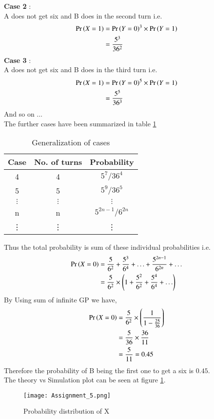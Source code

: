 \documentclass[journal,12pt,twocolumn]{IEEEtran}
\begin{document}
\textbf{Case 2} : \\
A does not get six and B does in the second turn i.e. 
\begin{align}
    \Pr\left(X=1\right) &= {\Pr\left(Y=0\right)}^3  \times \Pr\left(Y=1\right) \\
              &= \frac{5^3}{36^2}
\end{align}
\textbf{Case 3} : \\
A does not get six and B does in the third turn i.e. 
\begin{align}
    \Pr\left(X=1\right) &= {\Pr\left(Y=0\right)}^5  \times \Pr\left(Y=1\right) \\
              &= \frac{5^5}{36^3}
\end{align}
And so on $\hdots$ \\
The further cases have been summarized in table \ref{tab:Cases} \\
\begin{table}[hbt]
\centering
\begin{tabular}{|c|c|c|}
\hline
\textbf{Case}          & \textbf{No. of turns} & \textbf{Probability}  \\ \hline
4                      & 4                     & $5^7/36^4$             \\ \hline
5                      & 5                     & $ 5^9 / 36 ^5 $        \\ \hline
$\vdots$               & $\vdots$             & $\vdots$               \\
n                      & n                     & $5^{2n-1}/6^{2n} $      \\ \hline
\vdots                 & \vdots                & \vdots                  \\ \hline
\end{tabular}
\caption{Generalization of cases}
\label{tab:Cases}
\end{table}

Thus the total probability is sum of these individual probabilities i.e.
\begin{align}
    \Pr\left(X=0\right) &= \frac{5}{6^2} + \frac{5^3}{6^4} + \hdots + \frac{5^{2n-1}}{6^{2n}} +\hdots  \\
    &= \frac{5}{6^2} \times \left(1 + \frac{5^2}{6^2} + \frac{5^4}{6^4} + \hdots \right) 
\end{align}
By Using sum of infinite GP we have, 
\begin{align}
     \Pr\left(X=0\right) &= \frac{5}{6^2} \times \left(\frac{1}{1 - \frac{25}{36}}\right)  \\
       &= \frac{5}{36} \times \frac{36}{11} \\
       &= \frac{5}{11} = 0.45
\end{align}
Therefore the probability of B being the first one to get a six is $ 0.45 $.\\
The theory vs Simulation plot can be seen at figure \ref{fig::Probability distribution}.
\begin{figure}[h!]
    \centering
    \texttt{[image: Assignment\_5.png]}
    \caption{Probability distribution of X}
    \label{fig::Probability distribution}
\end{figure}
\end{document}
